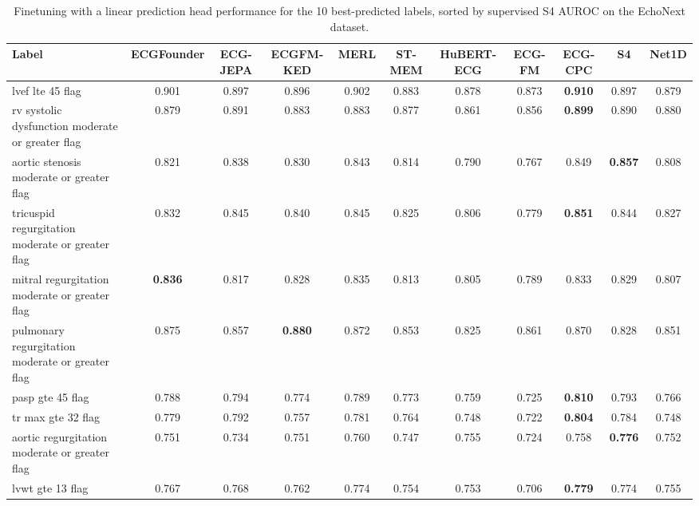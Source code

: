 \documentclass{article}
\begin{document}
                \begin{table}[htbp]
                    \centering
                    \tiny
                    \setlength{\tabcolsep}{2pt}
                    \caption{Finetuning with a linear prediction head performance for the 10 best-predicted labels, sorted by supervised S4 AUROC on the EchoNext dataset.}
                    \begin{tabular}{lcccccccccc}
                        \toprule
                        \textbf{Label} & \textbf{ECGFounder} & \textbf{ECG-JEPA} & \textbf{ECGFM-KED} & \textbf{MERL} & \textbf{ST-MEM} & \textbf{HuBERT-ECG} & \textbf{ECG-FM} & \textbf{ECG-CPC} & \textbf{S4} & \textbf{Net1D} \\
                        \midrule
                        lvef lte 45 flag & 0.901 & 0.897 & 0.896 & 0.902 & 0.883 & 0.878 & 0.873 & \textbf{0.910} & 0.897 & 0.879 \\
                        rv systolic dysfunction moderate or greater flag & 0.879 & 0.891 & 0.883 & 0.883 & 0.877 & 0.861 & 0.856 & \textbf{0.899} & 0.890 & 0.880 \\
                        aortic stenosis moderate or greater flag & 0.821 & 0.838 & 0.830 & 0.843 & 0.814 & 0.790 & 0.767 & 0.849 & \textbf{0.857} & 0.808 \\
                        tricuspid regurgitation moderate or greater flag & 0.832 & 0.845 & 0.840 & 0.845 & 0.825 & 0.806 & 0.779 & \textbf{0.851} & 0.844 & 0.827 \\
                        mitral regurgitation moderate or greater flag & \textbf{0.836} & 0.817 & 0.828 & 0.835 & 0.813 & 0.805 & 0.789 & 0.833 & 0.829 & 0.807 \\
                        pulmonary regurgitation moderate or greater flag & 0.875 & 0.857 & \textbf{0.880} & 0.872 & 0.853 & 0.825 & 0.861 & 0.870 & 0.828 & 0.851 \\
                        pasp gte 45 flag & 0.788 & 0.794 & 0.774 & 0.789 & 0.773 & 0.759 & 0.725 & \textbf{0.810} & 0.793 & 0.766 \\
                        tr max gte 32 flag & 0.779 & 0.792 & 0.757 & 0.781 & 0.764 & 0.748 & 0.722 & \textbf{0.804} & 0.784 & 0.748 \\
                        aortic regurgitation moderate or greater flag & 0.751 & 0.734 & 0.751 & 0.760 & 0.747 & 0.755 & 0.724 & 0.758 & \textbf{0.776} & 0.752 \\
                        lvwt gte 13 flag & 0.767 & 0.768 & 0.762 & 0.774 & 0.754 & 0.753 & 0.706 & \textbf{0.779} & 0.774 & 0.755 \\
                        \bottomrule
                    \end{tabular}
                    \label{tab:results_overview_echonext}
                \end{table}
\end{document}
